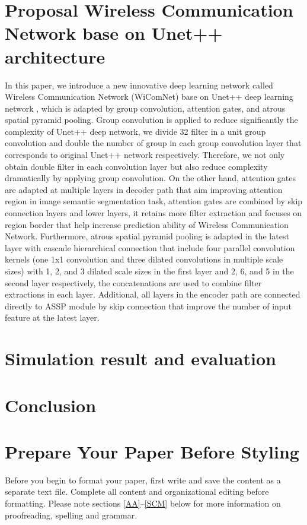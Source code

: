 \documentclass[journal]{IEEEtran} %
\begin{document}
\section{Proposal Wireless Communication Network base on Unet++ architecture}
In this paper, we introduce a new innovative deep learning network called Wireless Communication Network (WiComNet) base on Unet++ deep learning network \cite{b6}, which is adapted by group convolution, attention gates, and atrous spatial pyramid pooling. Group convolution is applied to reduce significantly the complexity of Unet++ deep network, we divide 32 filter in a unit group convolution and double the number of group in each group convolution layer that corresponds to original Unet++ network respectively. Therefore, we not only obtain double filter in each convolution layer but also reduce complexity dramatically by applying group convolution. On the other hand, attention gates are adapted at multiple layers in decoder path that aim improving attention region in image semantic segmentation task, attention gates are combined by skip connection layers and lower layers, it retains more filter extraction and focuses on region border that help increase prediction ability of Wireless Communication Network. Furthermore, atrous spatial pyramid pooling is adapted in the latest layer with cascade hierarchical connection \cite{b11} that include four parallel convolution kernels (one 1x1 convolution and three dilated convolutions in multiple scale sizes) with 1, 2, and 3 dilated scale sizes in the first layer and 2, 6, and 5 in the second layer respectively, the concatenations are used to combine filter extractions in each layer. Additional, all layers in the encoder path are connected directly to ASSP module by skip connection that improve the number of input feature at the latest layer.

\section{Simulation result and evaluation}

\section{Conclusion}

\section{Prepare Your Paper Before Styling}
Before you begin to format your paper, first write and save the content as a
separate text file. Complete all content and organizational editing before
formatting. Please note sections \ref{AA}--\ref{SCM} below for more information on
proofreading, spelling and grammar.
\end{document}
